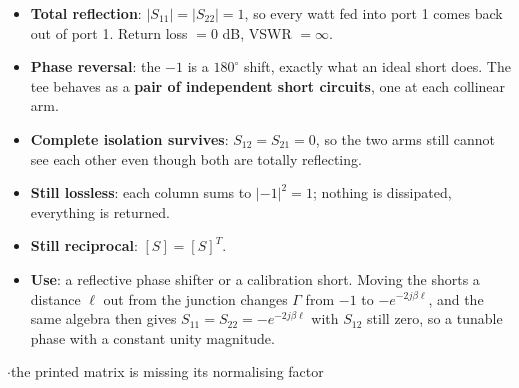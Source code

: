 \begin{itemize}
  \item \textbf{Total reflection}: $|S_{11}| = |S_{22}| = 1$, so every watt fed into
    port 1 comes back out of port 1. Return loss $= 0$ dB, VSWR $= \infty$.
  \item \textbf{Phase reversal}: the $-1$ is a $180^\circ$ shift, exactly what an ideal
    short does. The tee behaves as a \textbf{pair of independent short circuits}, one at
    each collinear arm.
  \item \textbf{Complete isolation survives}: $S_{12} = S_{21} = 0$, so the two arms still
    cannot see each other even though both are totally reflecting.
  \item \textbf{Still lossless}: each column sums to $|-1|^2 = 1$; nothing is dissipated,
    everything is returned.
  \item \textbf{Still reciprocal}: $[S] = [S]^{T}$.
  \item \textbf{Use}: a reflective phase shifter or a calibration short. Moving the shorts
    a distance $\ell$ out from the junction changes $\Gamma$ from $-1$ to
    $-e^{-2j\beta\ell}$, and the same algebra then gives
    $S_{11} = S_{22} = -e^{-2j\beta\ell}$ with $S_{12}$ still zero, so a tunable phase
    with a constant unity magnitude.
\end{itemize}

\vspace{2pt}

{\color{sub}\footnotesize {} \gap$\cdot$\gap the printed matrix is missing its normalising factor}

